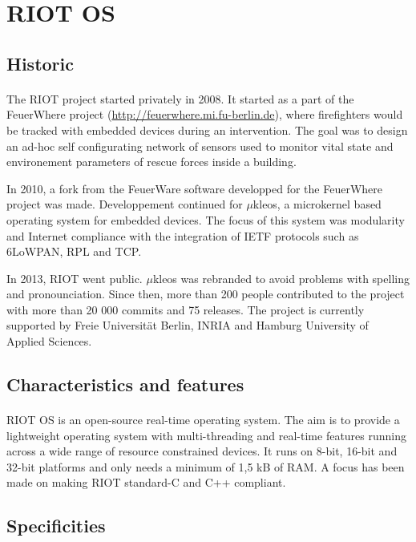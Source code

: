 \section{RIOT OS}

\subsection{Historic}
\paragraph{}
The RIOT project started privately in 2008.
It started as a part of the FeuerWhere project (\url{http://feuerwhere.mi.fu-berlin.de}), where firefighters would be tracked with embedded devices during an intervention.
The goal was to design an ad-hoc self configurating network of sensors used to monitor vital state and environement parameters of rescue forces inside a building.

In 2010, a fork from the FeuerWare software developped for the FeuerWhere project was made.
Developpement continued for $\mu$kleos, a microkernel based operating system for embedded devices.
The focus of this system was modularity and Internet compliance with the integration of IETF protocols such as 6LoWPAN, RPL and TCP.

In 2013, RIOT went public.
$\mu$kleos was rebranded to avoid problems with spelling and pronounciation.
Since then, more than 200 people contributed to the project with more than 20 000 commits and 75 releases.
The project is currently supported by Freie Universität Berlin, INRIA and Hamburg University of Applied Sciences.

\subsection{Characteristics and features}
\paragraph{}
RIOT OS is an open-source real-time operating system.
The aim is to provide a lightweight operating system with multi-threading and real-time features running across a wide range of resource constrained devices.
It runs on 8-bit, 16-bit and 32-bit platforms and only needs a minimum of 1,5 kB of RAM.
A focus has been made on making RIOT standard-C and C++ compliant.


\subsection{Specificities}
